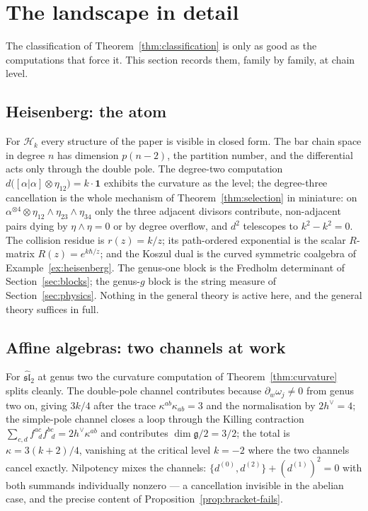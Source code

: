 \documentclass[11pt]{amsart}
\numberwithin{equation}{section}
\theoremstyle{plain}
\theoremstyle{definition}
\theoremstyle{remark}
\newcommand{\fg}{\mathfrak{g}}
\newcommand{\dvee}{h^{\vee}}
\begin{document}
\section{The landscape in detail}\label{sec:landscape}

The classification of Theorem~\ref{thm:classification} is only as good as
the computations that force it. This section records them, family by
family, at chain level.

\subsection{Heisenberg: the atom}

For $\mathcal{H}_k$ every structure of the paper is visible in closed
form. The bar chain space in degree $n$ has dimension $p(n-2)$, the
partition number, and the differential acts only through the double pole.
The degree-two computation
$d\bigl([\alpha|\alpha]\otimes\eta_{12}\bigr)=k\cdot\mathbf{1}$ exhibits
the curvature as the level; the degree-three cancellation is the whole
mechanism of Theorem~\ref{thm:selection} in miniature: on
$\alpha^{\otimes4}\otimes\eta_{12}\wedge\eta_{23}\wedge\eta_{34}$ only the
three adjacent divisors contribute, non-adjacent pairs dying by
$\eta\wedge\eta=0$ or by degree overflow, and $d^{2}$ telescopes to
$k^{2}-k^{2}=0$. The collision residue is $r(z)=k/z$; its
path-ordered exponential is the scalar $R$-matrix $R(z)=e^{k\hbar/z}$;
and the Koszul dual is the curved symmetric coalgebra of
Example~\ref{ex:heisenberg}. The genus-one block is the Fredholm
determinant of Section~\ref{sec:blocks}; the genus-$g$ block is the
string measure of Section~\ref{sec:physics}. Nothing in the general
theory is active here, and the general theory suffices in full.

\subsection{Affine algebras: two channels at work}

For $\widehat{\mathfrak{sl}}_2$ at genus two the curvature computation of
Theorem~\ref{thm:curvature} splits cleanly. The double-pole channel
contributes because $\partial_w\omega_j\neq0$ from genus two on, giving
$3k/4$ after the trace $\kappa^{ab}\kappa_{ab}=3$ and the normalisation
by $2\dvee=4$; the simple-pole channel closes a loop through the Killing
contraction $\sum_{c,d}f^{ac}_{\;\;d}f^{bc}_{\;\;d}=2\dvee\kappa^{ab}$
and contributes $\dim\fg/2=3/2$; the total is
$\kappa=3(k+2)/4$, vanishing at the critical level $k=-2$ where the two
channels cancel exactly. Nilpotency mixes the channels:
$\{d^{(0)},d^{(2)}\}+(d^{(1)})^{2}=0$ with both summands individually
nonzero --- a cancellation invisible in the abelian case, and the
precise content of Proposition~\ref{prop:bracket-fails}.
\end{document}
